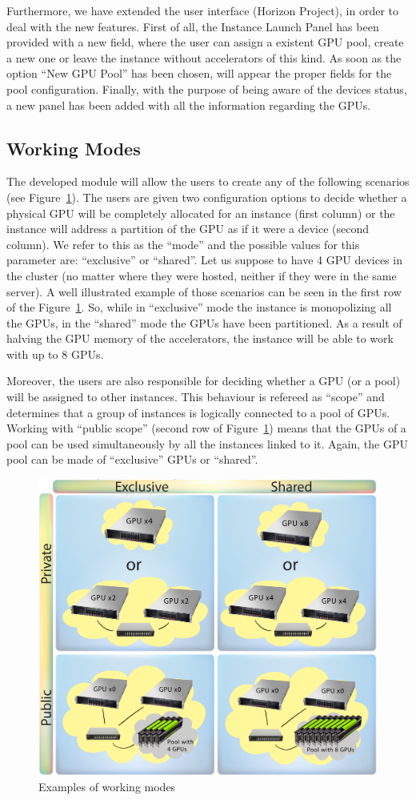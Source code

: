 \documentclass[a4paper,twoside]{article}
\begin{document}
Furthermore, we have extended the user interface (Horizon Project), in order to deal with the new features.
First of all, the Instance Launch Panel has been provided with a new field, where the user can assign a existent GPU pool, create a new one or leave the instance without accelerators of this kind.
As soon as the option ``New GPU Pool'' has been chosen, will appear the proper fields for the pool configuration.
Finally, with the purpose of being aware of the devices status, a new panel has been added with all the information regarding the GPUs.

\subsection{Working Modes}
The developed module will allow the users to create any of the following scenarios (see Figure~\ref{fig2}). 
The users are given two configuration options to decide whether a physical GPU will be completely allocated for an instance (first column) or the instance will address a partition of the GPU as if it were a device (second column).
We refer to this as the ``mode'' and the possible values for this parameter are: ``exclusive'' or ``shared''. 
Let us suppose to have 4 GPU devices in the cluster (no matter where they were hosted, neither if they were in the same server). 
A well illustrated example of those scenarios can be seen in the first row of the  Figure~\ref{fig2}.
So, while in ``exclusive'' mode the instance is monopolizing all the GPUs, in the ``shared'' mode the GPUs have been partitioned. 
As a result of halving the GPU memory of the accelerators, the instance will be able to work with up to 8 GPUs.

Moreover, the users are also responsible for deciding whether a GPU (or a pool) will be assigned to other instances. 
This behaviour is refereed as ``scope'' and determines that a group of instances is logically connected to a pool of GPUs.
Working with ``public scope'' (second row of Figure~\ref{fig2}) means that the GPUs of a pool can be used simultaneously by all the instances linked to it.
Again, the GPU pool can be made of ``exclusive'' GPUs or ``shared''.

\begin{figure}[!t]
  \centering
  \includegraphics[width=.5\textwidth]{images/workingmodes.jpg}
  \caption{Examples of working modes}
  \label{fig2}
\end{figure}
\end{document}
